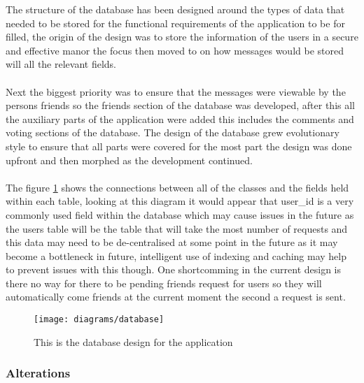 The structure of the database has been designed around the types of data that needed to be stored for the functional requirements of the application to be for filled, the origin of the design was to store the information of the users in a secure and effective manor the focus then moved to on how messages would be stored will all the relevant fields.\\
\\
Next the biggest priority was to ensure that the messages were viewable by the persons friends so the friends section of the database was developed, after this all the auxiliary parts of the application were added this includes the comments and voting sections of the database. The design of the database grew evolutionary style to ensure that all parts were covered for the most part the design was done upfront and then morphed as the development continued.\\
\\
The figure \ref{fig:diagram_database_image} shows the connections between all of the classes and the fields held within each table, looking at this diagram it would appear that user\_id is a very commonly used field within the database which may cause issues in the future as the users table will be the table that will take the most number of requests and this data may need to be de-centralised at some point in the future as it may become a bottleneck in future, intelligent use of indexing and caching may help to prevent issues with this though. One shortcomming in the current design is there no way for there to be pending friends request for users so they will automatically come friends at the current moment the second a request is sent.

\begin{figure}[H]
    \centering
    \texttt{[image: diagrams/database]}
    \caption{This is the database design for the application}
    \label{fig:diagram_database_image}
\end{figure} 

\subsubsection*{Alterations}

